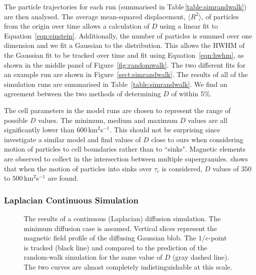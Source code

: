 The particle trajectories for each run (summarised in Table\,\ref{table:simrandwalk}) are then analysed. The average mean-squared displacement, $\langle R^2 \rangle$, of particles from the origin over time allows a calculation of $D$ using a linear fit to Equation~\ref{eqn:einstein}. Additionally, the number of particles is summed over one dimension and we fit a Gaussian to the distribution. This allows the \gls{HWHM} of the Gaussian fit to be tracked over time and fit using Equation~\ref{eqn:hwhm}, as shown in the middle panel of Figure~\ref{fig:randomwalk}. The two different fits for an example run are shown in Figure~\ref{sect:simrandwalk}. The results of all of the simulation runs are summarised in Table~\ref{table:simrandwalk}. We find an agreement between the two methods of determining $D$ of within 5$\%$. 

The cell parameters in the model runs are chosen to represent the range of possible $D$ values. The minimum, medium and maximum $D$ values are all significantly lower than 600\,km$^2$s$^{-1}$. This should not be surprising since \cite{Simon:1995} investigate a similar model and find values of $D$ close to ours when considering motion of particles to cell boundaries rather than to ``sinks". Magnetic elements are observed to collect in the intersection between multiple supergranules. \cite{Simon:1995} shows that when the motion of particles into sinks over $\tau_c$ is considered, $D$ values of $350$ to $500$\,km$^2$s$^{-1}$ are found.

\subsubsection{Laplacian Continuous Simulation}\label{sect:simcont}

\begin{figure}[!t]
\caption[Continuous diffusion simulation.]{The results of a continuous (Laplacian) diffusion simulation. The minimum diffusion case is assumed. Vertical slices represent the magnetic field profile of the diffusing Gaussian blob. The $1/e$-point is tracked (black line) and compared to the prediction of the random-walk simulation for the same value of $D$ (gray dashed line). The two curves are almost completely indistinguishable at this scale.}
\label{fig:comprandcont}
\end{figure}

